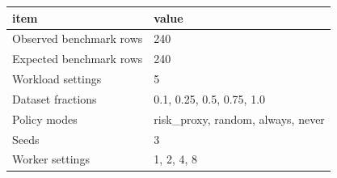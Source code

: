 \begin{tabular}{ll}
\toprule
item & value \\
\midrule
Observed benchmark rows & 240 \\
Expected benchmark rows & 240 \\
Workload settings & 5 \\
Dataset fractions & 0.1, 0.25, 0.5, 0.75, 1.0 \\
Policy modes & risk\_proxy, random, always, never \\
Seeds & 3 \\
Worker settings & 1, 2, 4, 8 \\
\bottomrule
\end{tabular}
